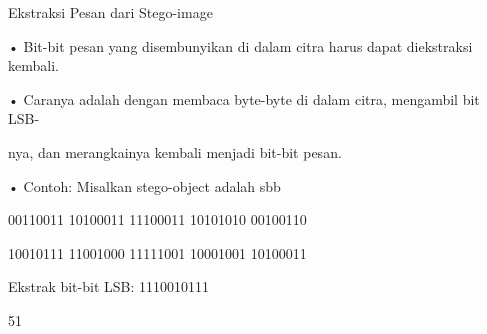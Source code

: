 \documentclass{article}
\begin{document}

Ekstraksi Pesan dari Stego-image

• Bit-bit pesan yang disembunyikan di dalam citra harus dapat diekstraksi kembali. 

• Caranya adalah dengan membaca byte-byte di dalam citra, mengambil bit LSB-

nya, dan merangkainya kembali menjadi bit-bit pesan. 

• Contoh: Misalkan stego-object adalah sbb

  00110011  10100011   11100011   10101010  00100110

  10010111  11001000   11111001    10001001  10100011 


 Ekstrak bit-bit LSB: 1110010111

51
\end{document}
